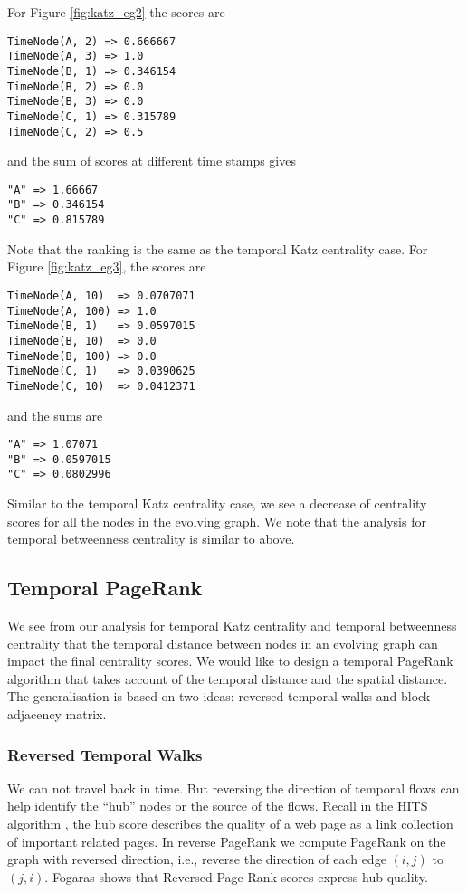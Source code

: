 \documentclass[12pt]{article}
\theoremstyle{definition}
\begin{document}
For Figure \ref{fig:katz_eg2} the scores are
\begin{lstlisting}
TimeNode(A, 2) => 0.666667
TimeNode(A, 3) => 1.0
TimeNode(B, 1) => 0.346154
TimeNode(B, 2) => 0.0
TimeNode(B, 3) => 0.0
TimeNode(C, 1) => 0.315789
TimeNode(C, 2) => 0.5
\end{lstlisting}
and the sum of scores at different time stamps gives
\begin{lstlisting}
"A" => 1.66667
"B" => 0.346154
"C" => 0.815789
\end{lstlisting}
Note that the ranking is the same as the temporal Katz centrality case.
For Figure \ref{fig:katz_eg3}, the scores are
\begin{lstlisting}
TimeNode(A, 10)  => 0.0707071
TimeNode(A, 100) => 1.0
TimeNode(B, 1)   => 0.0597015
TimeNode(B, 10)  => 0.0
TimeNode(B, 100) => 0.0
TimeNode(C, 1)   => 0.0390625
TimeNode(C, 10)  => 0.0412371
\end{lstlisting}
and the sums are
\begin{lstlisting}
"A" => 1.07071
"B" => 0.0597015
"C" => 0.0802996
\end{lstlisting}
Similar to the temporal Katz centrality case, we see a decrease of centrality scores
for all the nodes in the evolving graph.
We note that the analysis for temporal betweenness centrality is similar to above.

\subsection{Temporal PageRank}

We see from our analysis for temporal Katz centrality and temporal betweenness centrality
that the temporal distance between nodes in an evolving graph can impact the final centrality scores.
We would like to design a temporal PageRank algorithm that takes account of
the temporal distance and the spatial distance. The generalisation is based on two ideas:
reversed temporal walks and block adjacency matrix.

\subsubsection{Reversed Temporal Walks}

We can not travel back in time. But reversing the direction of temporal flows can help
identify the ``hub'' nodes or the source of the flows. Recall in the HITS algorithm \cite{kleinberg99},
the hub score describes the quality of a web page as a link collection of important related pages.
In reverse PageRank we compute PageRank on the graph with reversed direction, i.e., reverse the direction of each edge $(i,j)$ to $(j,i)$. Fogaras \cite{fogaras03, gleich15} shows that Reversed Page Rank scores express hub quality.
\end{document}
